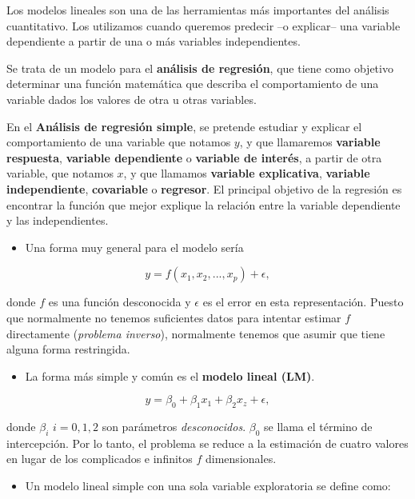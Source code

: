 \documentclass[]{book}
\providecommand{\tightlist}{%
  \setlength{\itemsep}{0pt}\setlength{\parskip}{0pt}}
\begin{document}
Los modelos lineales son una de las herramientas más importantes del
análisis cuantitativo. Los utilizamos cuando queremos predecir --o
explicar-- una variable dependiente a partir de una o más variables
independientes.

Se trata de un modelo para el \textbf{análisis de regresión}, que tiene
como objetivo determinar una función matemática que describa el
comportamiento de una variable dados los valores de otra u otras
variables.

En el \textbf{Análisis de regresión simple}, se pretende estudiar y
explicar el comportamiento de una variable que notamos \(y\), y que
llamaremos \textbf{variable respuesta}, \textbf{variable dependiente} o
\textbf{variable de interés}, a partir de otra variable, que notamos
\(x\), y que llamamos \textbf{variable explicativa}, \textbf{variable
independiente}, \textbf{covariable} o \textbf{regresor}. El principal
objetivo de la regresión es encontrar la función que mejor explique la
relación entre la variable dependiente y las independientes.

\begin{itemize}
\tightlist
\item
  Una forma muy general para el modelo sería
\end{itemize}

\[
      y = f(x_1,x_2,...,x_p) + \epsilon,
\]

donde \(f\) es una función desconocida y \(\epsilon\) es el error en
esta representación. Puesto que normalmente no tenemos suficientes datos
para intentar estimar \(f\) directamente (\emph{problema inverso}),
normalmente tenemos que asumir que tiene alguna forma restringida.

\begin{itemize}
\tightlist
\item
  La forma más simple y común es el \textbf{modelo lineal (LM)}.
\end{itemize}

\[
    y = \beta_0 + \beta_1 x_1 + \beta_2 x_z + \epsilon,
\]

donde \(\beta_i\) \(i=0,1,2\) son parámetros \emph{desconocidos}.
\(\beta_0\) se llama el término de intercepción. Por lo tanto, el
problema se reduce a la estimación de cuatro valores en lugar de los
complicados e infinitos \(f\) dimensionales.

\begin{itemize}
\tightlist
\item
  Un modelo lineal simple con una sola variable exploratoria se define
  como:
\end{itemize}
\end{document}
